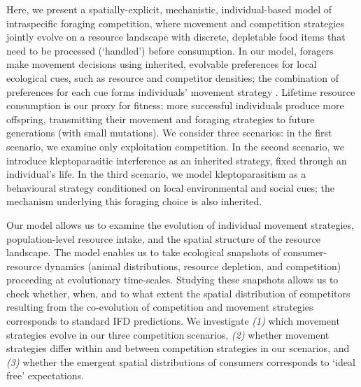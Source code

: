 \begin{refsection}
    Here, we present a spatially-explicit, mechanistic, individual-based model of intraspecific foraging competition, where movement and competition strategies jointly evolve on a resource landscape with discrete, depletable food items that need to be processed (`handled') before consumption.
    In our model, foragers make movement decisions using inherited, evolvable preferences for local ecological cues, such as resource and competitor densities; the combination of preferences for each cue forms individuals' movement strategy \citep[similar to relative step-selection:][]{fortin2005, avgar2016}.
    Lifetime resource consumption is our proxy for fitness; more successful individuals produce more offspring, transmitting their movement and foraging strategies to future generations (with small mutations).
    We consider three scenarios: in the first scenario, we examine only exploitation competition.
    In the second scenario, we introduce kleptoparasitic interference as an inherited strategy, fixed through an individual's life.
    In the third scenario, we model kleptoparasitism as a behavioural strategy conditioned on local environmental and social cues; the mechanism underlying this foraging choice is also inherited.

    Our model allows us to examine the evolution of individual movement strategies, population-level resource intake, and the spatial structure of the resource landscape.
    The model enables us to take ecological snapshots of consumer-resource dynamics (animal distributions, resource depletion, and competition) proceeding at evolutionary time-scales.
    Studying these snapshots allows us to check whether, when, and to what extent the spatial distribution of competitors resulting from the co-evolution of competition and movement strategies corresponds to standard IFD predictions.
    We investigate \textit{(1)} which movement strategies evolve in our three competition scenarios, \textit{(2)} whether movement strategies differ within and between competition strategies in our scenarios, and \textit{(3)} whether the emergent spatial distributions of consumers corresponds to `ideal free' expectations.

    {\printbibliography[heading=subbibliography]}

\end{refsection}
